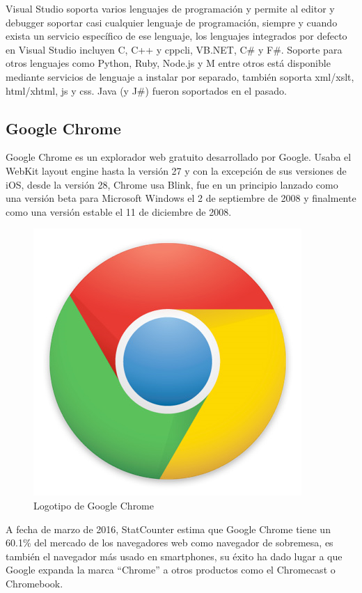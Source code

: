Visual Studio soporta varios lenguajes de programación y permite al editor y debugger soportar casi cualquier lenguaje de programación, siempre y cuando exista un servicio específico de ese lenguaje, los lenguajes integrados por defecto en Visual Studio incluyen C, C++ y \acrshort{cppcli}, VB.NET, C\# y F\#. Soporte para otros lenguajes como Python, Ruby, Node.js y M entre otros está disponible mediante servicios de lenguaje a instalar por separado, también soporta \acrshort{xml}/\acrshort{xslt}, \acrshort{html}/\acrshort{xhtml}, \acrfull{js} y \acrshort{css}. Java (y J\#) fueron soportados en el pasado.


\subsection{Google Chrome}

Google Chrome\cite{Chrome} es un explorador web gratuito desarrollado por Google. Usaba el WebKit layout engine hasta la versión 27 y con la excepción de sus versiones de iOS, desde la versión 28, Chrome usa Blink, fue en un principio lanzado como una versión beta para Microsoft Windows el 2 de septiembre de 2008 y finalmente como una versión estable el 11 de diciembre de 2008.

\begin{figure}[!htp]
	 \centering
	 \includegraphics[scale=0.3]{fig/googleChrome_logo}
	 \caption{Logotipo de Google Chrome}
\end{figure}

A fecha de marzo de 2016, StatCounter estima que Google Chrome tiene un 60.1\% del mercado de los navegadores web como navegador de sobremesa, es también el navegador más usado en smartphones, su éxito ha dado lugar a que Google expanda la marca “Chrome” a otros productos como el Chromecast o Chromebook.

